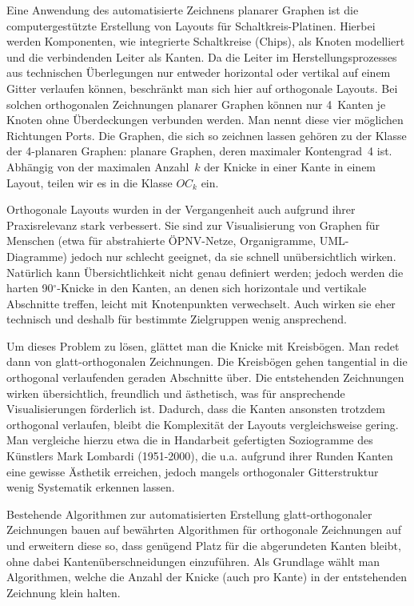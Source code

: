 \documentclass[a4paper]{scrreprt}
\theoremstyle{definition}
\newcommand{\degree}{\ensuremath{^\circ}}
\begin{document}
Eine Anwendung des  automatisierte Zeichnens planarer Graphen ist die computergestützte Erstellung von Layouts für Schaltkreis-Platinen. Hierbei werden Komponenten, wie integrierte Schaltkreise (Chips), als Knoten modelliert und die verbindenden Leiter als Kanten. Da die Leiter im Herstellungsprozesses  aus technischen Überlegungen nur entweder horizontal oder vertikal auf einem Gitter verlaufen können, beschränkt man sich hier auf orthogonale Layouts. Bei solchen orthogonalen Zeichnungen planarer Graphen können nur 4~Kanten je Knoten ohne Überdeckungen verbunden werden. Man nennt diese vier möglichen Richtungen Ports. Die Graphen, die sich so zeichnen lassen gehören zu der Klasse der 4-planaren Graphen: planare Graphen, deren maximaler Kontengrad~4 ist. Abhängig von der maximalen Anzahl~$k$ der Knicke in einer Kante in einem Layout, teilen wir es in die Klasse $OC_k$ ein. %

Orthogonale Layouts wurden in der Vergangenheit auch aufgrund ihrer Praxisrelevanz stark verbessert. Sie sind zur Visualisierung von Graphen für Menschen (etwa für abstrahierte ÖPNV-Netze, Organigramme, UML-Diagramme) jedoch nur schlecht geeignet, da sie schnell unübersichtlich wirken. %
Natürlich kann Übersichtlichkeit nicht genau definiert werden; jedoch werden die harten 90\degree-Knicke in den Kanten, an denen sich horizontale und vertikale Abschnitte treffen, leicht mit Knotenpunkten verwechselt. Auch wirken sie eher technisch und deshalb für bestimmte Zielgruppen wenig ansprechend.

Um dieses Problem zu lösen, glättet man die Knicke mit Kreisbögen. Man redet dann von glatt-orthogonalen Zeichnungen. Die Kreisbögen gehen tangential in die orthogonal verlaufenden geraden Abschnitte über. Die entstehenden Zeichnungen wirken übersichtlich, freundlich und ästhetisch, was für ansprechende Visualisierungen förderlich ist. Dadurch, dass die Kanten ansonsten trotzdem orthogonal verlaufen, bleibt die Komplexität der Layouts vergleichsweise gering. Man vergleiche hierzu etwa die in Handarbeit gefertigten Soziogramme des Künstlers Mark Lombardi (1951-2000), die u.a. aufgrund ihrer Runden Kanten eine gewisse Ästhetik erreichen, jedoch mangels orthogonaler Gitterstruktur wenig Systematik erkennen lassen. 

Bestehende Algorithmen zur automatisierten Erstellung glatt-orthogonaler Zeichnungen bauen auf bewährten Algorithmen für orthogonale Zeichnungen auf und erweitern diese so, dass genügend Platz für die abgerundeten Kanten bleibt, ohne dabei Kantenüberschneidungen einzuführen. Als Grundlage wählt man Algorithmen, welche die Anzahl der Knicke (auch pro Kante) in der entstehenden Zeichnung klein halten. 
\end{document}
